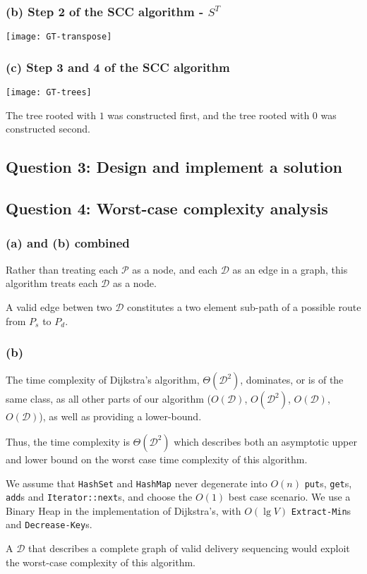 \documentclass[11pt,a4paper]{article}
\begin{document}
\subsubsection*{(b) Step 2 of the SCC algorithm - $S^T$}

\texttt{[image: GT-transpose]}

\subsubsection*{(c) Step 3 and 4 of the SCC algorithm}

\texttt{[image: GT-trees]}

The tree rooted with $1$ was constructed first, and the tree rooted with $0$ was constructed second.

\newpage

\subsection*{Question 3: Design and implement a solution}

\subsection*{Question 4: Worst-case complexity analysis}


\subsubsection*{(a) and (b) combined}

Rather than treating each $\mathcal{P}$ as a node, and each $\mathcal{D}$ as an edge in a graph, this algorithm treats each $\mathcal{D}$ as a node. 

A valid edge betwen two $\mathcal{D}$ constitutes a two element sub-path of a possible route from $P_s$ to $P_d$.

\begingroup
\fontsize{11pt}{11pt}\selectfont
 
\endgroup

\subsubsection*{(b)}

The time complexity of Dijkstra's algorithm, $\Theta(\mathcal{D}^2)$, dominates, or is of the same class, as all other parts of our algorithm ($O(\mathcal{D})$, $O(\mathcal{D}^2)$, $O(\mathcal{D})$, $O(\mathcal{D})$), as well as providing a lower-bound.

Thus, the time complexity is $\Theta(\mathcal{D}^2)$ which describes both an asymptotic upper and lower bound on the worst case time complexity of this algorithm.

We assume that \texttt{HashSet} and \texttt{HashMap} never degenerate into $O(n)$ \texttt{put}s, \texttt{get}s, \texttt{add}s and \texttt{Iterator::next}s, and choose the $O(1)$ best case scenario. We use a Binary Heap in the implementation of Dijkstra's, with $O(\lg V)$ \texttt{Extract-Min}s and \texttt{Decrease-Key}s.

A $\mathcal{D}$ that describes a complete graph of valid delivery sequencing would exploit the worst-case complexity of this algorithm.
\end{document}

